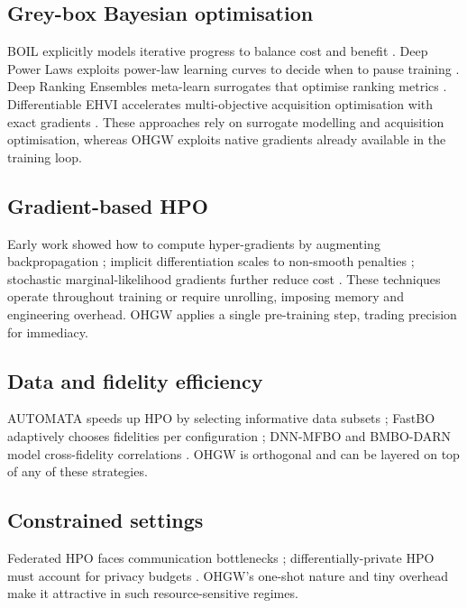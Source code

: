 \documentclass{article} %
\begin{document}
\subsection{Grey-box Bayesian optimisation}
BOIL explicitly models iterative progress to balance cost and benefit \cite{nguyen-2019-bayesian}. Deep Power Laws exploits power-law learning curves to decide when to pause training \cite{kadra-2023-scaling}. Deep Ranking Ensembles meta-learn surrogates that optimise ranking metrics \cite{khazi-2023-deep}. Differentiable EHVI accelerates multi-objective acquisition optimisation with exact gradients \cite{daulton-2020-differentiable}. These approaches rely on surrogate modelling and acquisition optimisation, whereas OHGW exploits native gradients already available in the training loop.

\subsection{Gradient-based HPO}
Early work showed how to compute hyper-gradients by augmenting backpropagation \cite{chandra-2019-gradient}; implicit differentiation scales to non-smooth penalties \cite{bertrand-2020-implicit}; stochastic marginal-likelihood gradients further reduce cost \cite{immer-2023-stochastic}. These techniques operate throughout training or require unrolling, imposing memory and engineering overhead. OHGW applies a single pre-training step, trading precision for immediacy.

\subsection{Data and fidelity efficiency}
AUTOMATA speeds up HPO by selecting informative data subsets \cite{killamsetty-2022-automata}; FastBO adaptively chooses fidelities per configuration \cite{jiang-2024-efficient}; DNN-MFBO and BMBO-DARN model cross-fidelity correlations \cite{li-2020-multi,li-2021-batch}. OHGW is orthogonal and can be layered on top of any of these strategies.

\subsection{Constrained settings}
Federated HPO faces communication bottlenecks \cite{khodak-2021-federated}; differentially-private HPO must account for privacy budgets \cite{panda-2022-new,wang-2023-hypo}. OHGW's one-shot nature and tiny overhead make it attractive in such resource-sensitive regimes.
\end{document}
